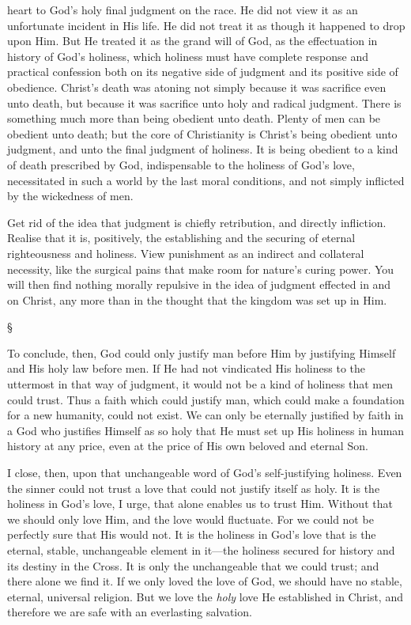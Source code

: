 \documentclass[12pt,a5paper,twoside,titlepage]{book}
\begin{document}
heart to God's holy final judgment on the race. 
He did not view it as an unfortunate incident 
in His life. He did not treat it as though it 
happened to drop upon Him. But He treated 
it as the grand will of God, as the effectuation 
in history of God's holiness, which holiness 
must have complete response and practical 
confession both on its negative side of judgment 
and its positive side of obedience. Christ's 
death was atoning not simply because it was 
sacrifice even unto death, but because it was 
sacrifice unto holy and radical judgment. There 
is something much more than being obedient 
unto death. Plenty of men can be obedient unto 
death; but the core of Christianity is Christ's 
being obedient unto judgment, and unto the 
final judgment of holiness. It is being obedient 
to a kind of death prescribed by God, indispensable 
to the holiness of God's love, necessitated 
in such a world by the last moral conditions, and 
not simply inflicted by the wickedness of men. 

Get rid of the idea that judgment is chiefly 
retribution, and directly infliction. Realise that 
it is, positively, the establishing and the securing 
of eternal righteousness and holiness. View 
punishment as an indirect and collateral necessity, 
like the surgical pains that make room for 
nature's curing power. You will then find 
nothing morally repulsive in the idea of judgment
effected in and on Christ, any more than 
in the thought that the kingdom was set up 
in Him. 

\begin{center}
\S
\end{center}

To conclude, then, God could only justify man 
before Him by justifying Himself and His holy 
law before men. If He had not vindicated His 
holiness to the uttermost in that way of judgment, 
it would not be a kind of holiness that 
men could trust. Thus a faith which could 
justify man, which could make a foundation for 
a new humanity, could not exist. We can only 
be eternally justified by faith in a God who 
justifies Himself as so holy that He must set 
up His holiness in human history at any price, 
even at the price of His own beloved and 
eternal Son. 

I close, then, upon that unchangeable word of 
God's self-justifying holiness. Even the sinner 
could not trust a love that could not justify itself 
as holy. It is the holiness in God's love, I urge, 
that alone enables us to trust Him. Without 
that we should only love Him, and the love 
would fluctuate. For we could not be perfectly 
sure that His would not. It is the holiness in 
God's love that is the eternal, stable, unchangeable 
element in it---the holiness secured for 
history and its destiny in the Cross. It is only 
the unchangeable that we could trust; and 
there alone we find it. If we only loved the 
love of God, we should have no stable, eternal, 
universal religion. But we love the \textit{holy} love 
He established in Christ, and therefore we 
are safe with an everlasting salvation. 
\end{document}
